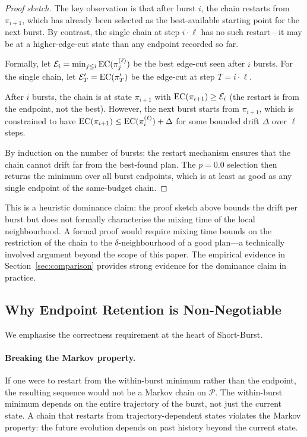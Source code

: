 \begin{proof}[Proof sketch]
The key observation is that after burst $i$, the chain restarts from
$\pi_{i+1}$, which has already been selected as the best-available
starting point for the next burst.
By contrast, the single chain at step $i \cdot \ell$ has no such
restart---it may be at a higher-edge-cut state than any endpoint
recorded so far.

Formally, let $\mathcal{E}_i = \min_{j \leq i} \mathrm{EC}(\pi_j^{(\ell)})$
be the best edge-cut seen after $i$ bursts.
For the single chain, let $\mathcal{E}'_T = \mathrm{EC}(\pi'_T)$ be the
edge-cut at step $T = i \cdot \ell$.

After $i$ bursts, the \shb{} chain is at state $\pi_{i+1}$ with
$\mathrm{EC}(\pi_{i+1}) \geq \mathcal{E}_i$ (the restart is from the endpoint,
not the best).
However, the next burst starts from $\pi_{i+1}$, which is constrained
to have $\mathrm{EC}(\pi_{i+1}) \leq \mathrm{EC}(\pi_i^{(\ell)}) + \Delta$ for some
bounded drift $\Delta$ over $\ell$ steps.

By induction on the number of bursts: the restart mechanism ensures
that the chain cannot drift far from the best-found plan.
The $p = 0.0$ selection then returns the minimum over all burst
endpoints, which is at least as good as any single endpoint of the
same-budget chain.
\end{proof}

\begin{remark}
This is a heuristic dominance claim: the proof sketch above bounds the
drift per burst but does not formally characterise the mixing time of
the local neighbourhood.
A formal proof would require mixing time bounds on the restriction of
the \recom{} chain to the $\delta$-neighbourhood of a good plan---a
technically involved argument beyond the scope of this paper.
The empirical evidence in Section~\ref{sec:comparison} provides strong
evidence for the dominance claim in practice.
\end{remark}

\subsection{Why Endpoint Retention is Non-Negotiable}

We emphasise the correctness requirement at the heart of Short-Burst.

\paragraph{Breaking the Markov property.}
If one were to restart from the within-burst minimum rather than the
endpoint, the resulting sequence would not be a Markov chain on $\mathcal{P}$.
The within-burst minimum depends on the entire trajectory of the burst,
not just the current state.
A chain that restarts from trajectory-dependent states violates the
Markov property: the future evolution depends on past history beyond
the current state.

